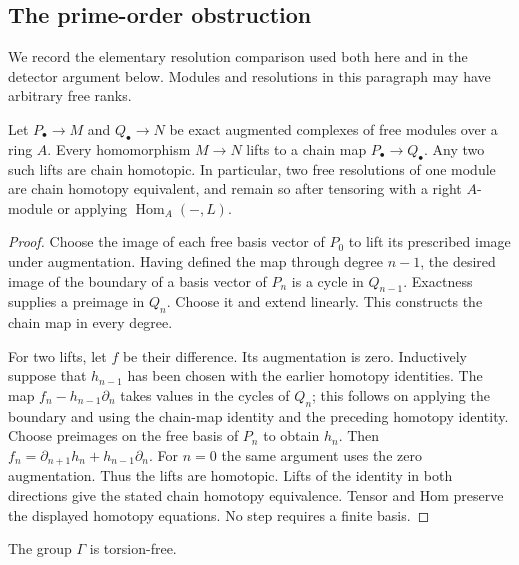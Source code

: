 \subsection{The prime-order obstruction}

We record the elementary resolution comparison used both here and
in the detector argument below.  Modules and resolutions in this
paragraph may have arbitrary free ranks.

\begin{lemma}
\label{lem:free-resolution-comparison}
Let $P_\bullet\to M$ and $Q_\bullet\to N$ be exact augmented
complexes of free modules over a ring $A$.  Every homomorphism
$M\to N$ lifts to a chain map $P_\bullet\to Q_\bullet$.
Any two such lifts are chain homotopic.  In particular, two free
resolutions of one module are chain homotopy equivalent, and remain
so after tensoring with a right $A$-module or applying
$\operatorname{Hom}_A(-,L)$.
\end{lemma}

\begin{proof}
Choose the image of each free basis vector of $P_0$ to lift its
prescribed image under augmentation.  Having defined the map through
degree $n-1$, the desired image of the boundary of a basis vector
of $P_n$ is a cycle in $Q_{n-1}$.  Exactness supplies a preimage in
$Q_n$.  Choose it and extend linearly.  This constructs the chain
map in every degree.

For two lifts, let $f$ be their difference.  Its augmentation is
zero.  Inductively suppose that $h_{n-1}$ has been chosen with
the earlier homotopy identities.  The map
$f_n-h_{n-1}\partial_n$ takes values in the cycles of $Q_n$;
this follows on applying the boundary and using the chain-map
identity and the preceding homotopy identity.  Choose preimages
on the free basis of $P_n$ to obtain $h_n$.  Then
$f_n=\partial_{n+1}h_n+h_{n-1}\partial_n$.
For $n=0$ the same argument uses the zero augmentation.  Thus the
lifts are homotopic.  Lifts of the identity in both directions give
the stated chain homotopy equivalence.  Tensor and Hom preserve
the displayed homotopy equations.  No step requires a finite basis.
\end{proof}

\begin{lemma}
\label{lem:no-prime-torsion}
The group $\Gamma$ is torsion-free.
\end{lemma}

